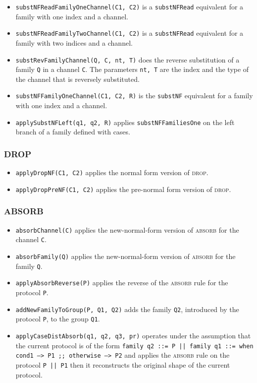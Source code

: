 \begin{itemize}
   \item  \texttt{substNFReadFamilyOneChannel(C1, C2)} is a \texttt{substNFRead} equivalent for a family with one index and a channel.
   \item  \texttt{substNFReadFamilyTwoChannel(C1, C2)} is a \texttt{substNFRead} equivalent for a  family with two indices and a channel.
   \item  \texttt{substRevFamilyChannel(Q, C, nt, T)} does the reverse substitution of a family \texttt{Q} in a channel \texttt{C}. The parameters \texttt{nt, T} are the index and the type of the channel that is reversely substituted.
   \item  \texttt{substNFFamilyOneChannel(C1, C2, R)} is the \texttt{substNF} equivalent for a family with one index and a channel.
   \item  \texttt{applySubstNFLeft(q1, q2, R)} applies \texttt{substNFFamiliesOne} on the left branch of a family defined with cases.
\end{itemize}  

\subsubsection{DROP}

\begin{itemize}
\item \texttt{applyDropNF(C1, C2)} applies the normal form version of \textsc{drop}.
\item \texttt{applyDropPreNF(C1, C2)} applies the pre-normal form
version of \textsc{drop}.
\end{itemize}

\subsubsection{ABSORB}

\begin{itemize}
\item \texttt{absorbChannel(C)} applies the new-normal-form version of
\textsc{absorb} for the channel \texttt{C}.
\item \texttt{absorbFamily(Q)} applies the new-normal-form version
of \textsc{absorb} for the family \texttt{Q}.
\item \texttt{applyAbsorbReverse(P)} applies the reverse of the 
\textsc{absorb} rule for the protocol \texttt{P}.
\item \texttt{addNewFamilyToGroup(P, Q1, Q2)} adds the family \texttt{Q2},
introduced by the protocol \texttt{P}, to the group \texttt{Q1}.
\item \texttt{applyCaseDistAbsorb(q1, q2, q3, pr)} operates
under the assumption that the current protocol is of the form
\texttt{family q2 ::= P || family q1 ::= when cond1 --> P1 ;; otherwise --> P2} and applies the \textsc{absorb} rule on the protocol
\texttt{P || P1} then it reconstructs the original shape of the
current protocol.
\end{itemize}

